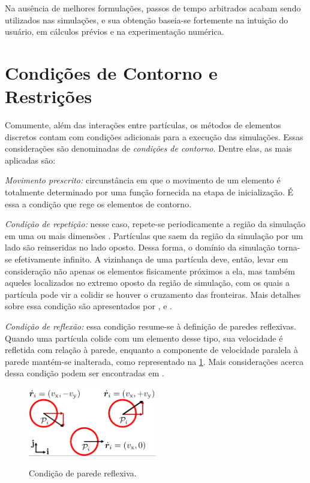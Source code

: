 Na ausência de melhores formulações, passos de tempo arbitrados acabam sendo utilizados nas simulações, e sua obtenção baseia-se fortemente na intuição do usuário, em cálculos prévios e na experimentação numérica.

\section{Condições de Contorno e Restrições} \label{sec:boundary_condition}

Comumente, além das interações entre partículas, os métodos de elementos discretos contam com condições adicionais para a execução das simulações. Essas considerações são denominadas de \textit{condições de contorno}. Dentre elas, as mais aplicadas são:
\begin{alineas}
\item \textit{Movimento prescrito:} circunstância em que o movimento de um elemento é totalmente determinado por uma função fornecida na etapa de inicialização. É essa a condição que rege os elementos de contorno.
\item \textit{Condição de repetição:} nesse caso, repete-se periodicamente a região da simulação em uma ou mais dimensões \cite[p. 15]{bib:computational_granular_dynamics}. Partículas que saem da região da simulação por um lado são reinseridas no lado oposto. Dessa forma, o domínio da simulação torna-se efetivamente infinito. A vizinhança de uma partícula deve, então, levar em consideração não apenas os elementos fisicamente próximos a ela, mas também aqueles localizados no extremo oposto da região de simulação, com os quais a partícula pode vir a colidir se houver o cruzamento das fronteiras. Mais detalhes sobre essa condição são apresentados por ,  e .
\item \textit{Condição de reflexão:} essa condição resume-se à definição de paredes reflexivas. Quando uma partícula colide com um elemento desse tipo, sua velocidade é refletida com relação à parede, enquanto a componente de velocidade paralela à parede mantém-se inalterada, como representado na \cref{fig:boundary_conditions:reflecting_boundary}. Mais considerações acerca dessa condição podem ser encontradas em .

\begin{figure}[h]
	\caption{Condição de parede reflexiva.}
	\centering
		\includegraphics[width=0.5\textwidth]{images/discrete_element_method/boundary_conditions/reflecting_boundary.pdf}
	\label{fig:boundary_conditions:reflecting_boundary}
	\sourceMe
\end{figure}


\end{alineas}
